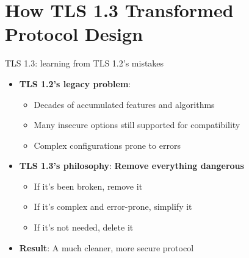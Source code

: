 \ifdefined\PRESENTATION\else\PassOptionsToClass{handout}{beamer}\fi\documentclass[aspectratio=169, lualatex]{beamer}
\begin{document}
\section{How TLS 1.3 Transformed Protocol Design}

\begin{frame}{TLS 1.3: learning from TLS 1.2's mistakes}
	\begin{itemize}
		\item \textbf{TLS 1.2's legacy problem}:
		      \begin{itemize}
			      \item Decades of accumulated features and algorithms
			      \item Many insecure options still supported for compatibility
			      \item Complex configurations prone to errors
		      \end{itemize}
		\item \textbf{TLS 1.3's philosophy}: \textbf{Remove everything dangerous}
		      \begin{itemize}
			      \item If it's been broken, remove it
			      \item If it's complex and error-prone, simplify it
			      \item If it's not needed, delete it
		      \end{itemize}
		\item \textbf{Result}: A much cleaner, more secure protocol
	\end{itemize}
\end{frame}
\end{document}
